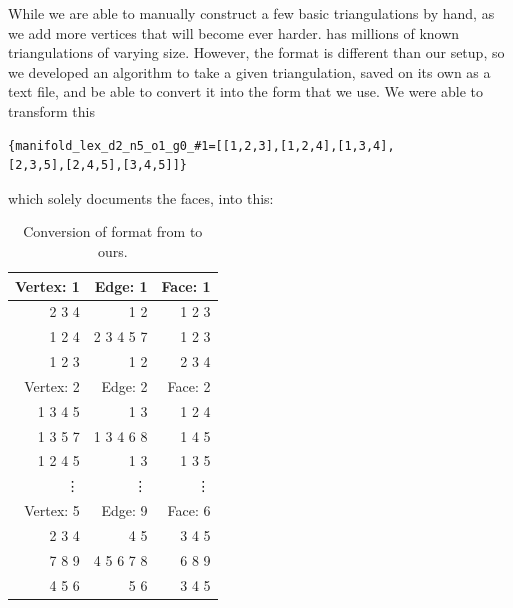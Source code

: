 \documentclass[12pt]{article}
\begin{document}
\noindent While we are able to manually construct a few basic triangulations by hand, as we add more vertices that will become ever harder. \cite{lutzmanifold} has millions of known triangulations of varying size. However, the format is different than our setup, so we developed an algorithm to take a given triangulation, saved on its own as a text file, and be able to convert it into the form that we use. We were able to transform this
  
\begin{verbatim}{manifold_lex_d2_n5_o1_g0_#1=[[1,2,3],[1,2,4],[1,3,4],
[2,3,5],[2,4,5],[3,4,5]]}
\end{verbatim}
 
which solely documents the faces, into this:

\begin{table}
\begin{center}
\begin{tabular}{|r|r|r|}
\hline
 Vertex: 1 &    Edge: 1 &    Face: 1 \\ \hline 

     2 3 4 &        1 2 &     1 2 3  \\

    1 2 4  & 2 3 4 5 7  &     1 2 3  \\

    1 2 3  &       1 2  &     2 3 4  \\ \hline 

 Vertex: 2 &    Edge: 2 &    Face: 2 \\ \hline

   1 3 4 5 &        1 3 &     1 2 4  \\

  1 3 5 7  & 1 3 4 6 8  &     1 4 5  \\

  1 2 4 5  &       1 3  &     1 3 5  \\ \hline 

 			\vdots & \vdots & \vdots \\ \hline 

 Vertex: 5 &    Edge: 9 &    Face: 6 \\ \hline

     2 3 4 &        4 5 &     3 4 5  \\

    7 8 9  & 4 5 6 7 8  &     6 8 9  \\

     4 5 6 &       5 6  &     3 4 5  \\
\hline
\end{tabular}
\end{center}
\caption{Conversion of format from \cite{lutzmanifold} to ours.}
\end{table}  
\end{document}
